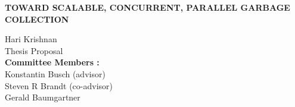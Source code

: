 \documentclass{article}
\begin{document}
\renewcommand\@pnumwidth{1.55em}
\renewcommand\@tocrmarg{9.55em}
\renewcommand*\l@figure{\@dottedtocline{1}{0em}{3.1em}}
\let\l@table\l@figure

\thispagestyle{empty}
\begin{titlepage}
\vspace*{\fill}
  \begin{center}
\textbf{TOWARD SCALABLE, CONCURRENT, PARALLEL GARBAGE COLLECTION}

                                       

\doublespacing
\vspace{2 in}
 Hari Krishnan \\
 Thesis Proposal \\
\textbf{Committee Members :}\\
                    Konstantin Busch (advisor)\\
                      Steven R Brandt (co-advisor)\\
                      Gerald Baumgartner\\
 
\end{center}
\vspace*{\fill}
\end{titlepage}

\pagebreak

\end{document}
